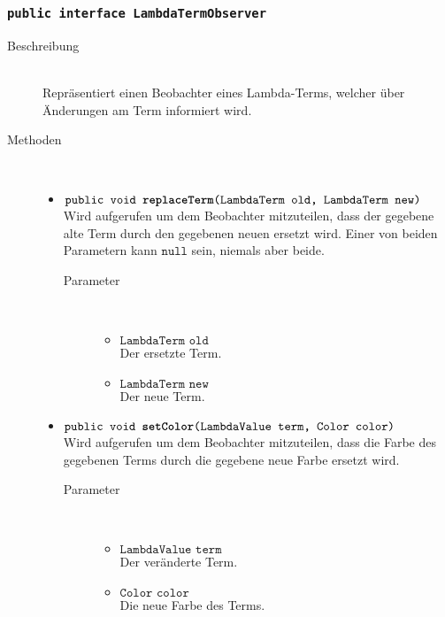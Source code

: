 \subsubsection{\normalfont \texttt{public interface \textbf{LambdaTermObserver}}}

\begin{description}
\item[Beschreibung] \hfill \\ Repräsentiert einen Beobachter eines Lambda-Terms, welcher über Änderungen am Term informiert wird.

\item[Methoden] \hfill \\
	\vspace{-.8cm}
	\begin{itemize}
		\item $\texttt{public void \textbf{replaceTerm}(LambdaTerm old, LambdaTerm new)}$ \\ Wird aufgerufen um dem Beobachter mitzuteilen, dass der gegebene alte Term durch den gegebenen neuen ersetzt wird. Einer von beiden Parametern kann $\texttt{null}$ sein, niemals aber beide.
		\begin{description}
			\item[Parameter] \hfill \\
			\vspace{-.8cm}
			\begin{itemize}
				\item $\texttt{LambdaTerm old}$ \\ Der ersetzte Term.
				\item $\texttt{LambdaTerm new}$ \\ Der neue Term.
			\end{itemize}
		\end{description}
		
		\item $\texttt{public void \textbf{setColor}(LambdaValue term, Color color)}$ \\ Wird aufgerufen um dem Beobachter mitzuteilen, dass die Farbe des gegebenen Terms durch die gegebene neue Farbe ersetzt wird.
		\begin{description}
			\item[Parameter] \hfill \\
			\vspace{-.8cm}
			\begin{itemize}
				\item $\texttt{LambdaValue term}$ \\ Der veränderte Term.
				\item $\texttt{Color color}$ \\ Die neue Farbe des Terms.
			\end{itemize}
		\end{description}
	\end{itemize}
\end{description}

